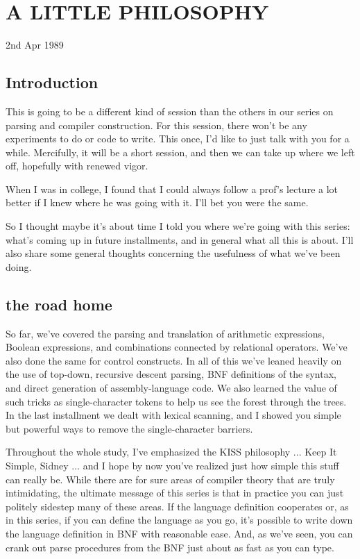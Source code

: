 
\chapter{A LITTLE PHILOSOPHY}

2nd Apr 1989

\section{Introduction}

This is going to be a  different  kind of session than the others in our series on  parsing  and  compiler  construction. For this session, there won't be  any  experiments to do or code to write. This  once, I'd  like  to  just  talk  with  you  for  a  while. Mercifully, it will be a short  session, and then we can take up where we left off, hopefully with renewed vigor.

When  I  was  in college, I found that I could  always  follow  a prof's lecture a lot better if I knew where he was going with it. I'll bet you were the same.

So I thought maybe it's about  time  I told you where we're going with this series: what's coming up in future installments, and in general what all  this  is  about. I'll also share some general thoughts concerning the usefulness of what we've been doing.

\section{the road home}

So far, we've  covered  the parsing and translation of arithmetic expressions, Boolean expressions, and combinations connected  by relational  operators. We've also done the  same  for  control constructs. In  all of this we've leaned heavily on the use of top-down, recursive  descent  parsing, BNF  definitions  of  the syntax, and direct generation of assembly-language code. We also learned the value of  such  tricks  as single-character tokens to help  us  see  the  forest  through  the  trees. In  the  last installment  we dealt with lexical scanning, and  I  showed  you simple but powerful ways to remove the single-character barriers.

Throughout the whole study, I've emphasized  the  KISS philosophy ... Keep It Simple, Sidney ... and I hope by now  you've realized just  how  simple  this stuff can really be. While there are for sure areas of compiler  theory  that  are truly intimidating, the ultimate message of this series is that in practice you  can just politely  sidestep   many  of  these  areas. If  the  language definition  cooperates  or, as in this series, if you can define the language as you go, it's possible to write down  the language definition in BNF with reasonable ease. And, as we've  seen, you can crank out parse procedures from the BNF just about as fast as you can type.

